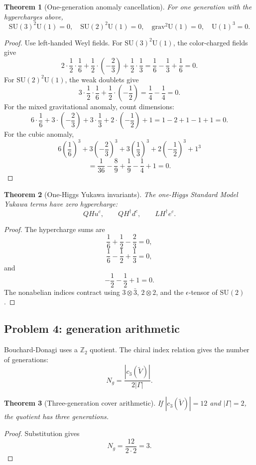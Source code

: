 \documentclass[11pt]{article}
\newtheorem{theorem}{Theorem}[section]
\theoremstyle{remark}
\theoremstyle{plain}
\newcommand{\SU}{\mathrm{SU}}
\newcommand{\U}{\mathrm{U}}
\newcommand{\Z}{\mathbb Z}
\begin{document}
\begin{theorem}[One-generation anomaly cancellation]
For one generation with the hypercharges above,
\[
\SU(3)^2\U(1)=0,\quad
\SU(2)^2\U(1)=0,\quad
\mathrm{grav}^2\U(1)=0,\quad
\U(1)^3=0.
\]
\end{theorem}

\begin{proof}
Use left-handed Weyl fields. For \(\SU(3)^2\U(1)\), the color-charged fields give
\[
2\cdot\frac12\cdot\frac16
+\frac12\cdot\left(-\frac23\right)
+\frac12\cdot\frac13
=
\frac16-\frac13+\frac16=0.
\]
For \(\SU(2)^2\U(1)\), the weak doublets give
\[
3\cdot\frac12\cdot\frac16
+\frac12\cdot\left(-\frac12\right)
=\frac14-\frac14=0.
\]
For the mixed gravitational anomaly, count dimensions:
\[
6\cdot\frac16
+3\cdot\left(-\frac23\right)
+3\cdot\frac13
+2\cdot\left(-\frac12\right)
+1
=1-2+1-1+1=0.
\]
For the cubic anomaly,
\[
6\left(\frac16\right)^3
+3\left(-\frac23\right)^3
+3\left(\frac13\right)^3
+2\left(-\frac12\right)^3
+1^3
\]
\[
=\frac1{36}-\frac89+\frac19-\frac14+1
=0.
\]
\end{proof}

\begin{theorem}[One-Higgs Yukawa invariants]
The one-Higgs Standard Model Yukawa terms have zero hypercharge:
\[
QHu^c,\qquad QH^\dagger d^c,\qquad LH^\dagger e^c.
\]
\end{theorem}

\begin{proof}
The hypercharge sums are
\[
\frac16+\frac12-\frac23=0,
\]
\[
\frac16-\frac12+\frac13=0,
\]
and
\[
-\frac12-\frac12+1=0.
\]
The nonabelian indices contract using \(3\otimes\bar3\), \(2\otimes2\), and the
\(\epsilon\)-tensor of \(\SU(2)\).
\end{proof}

\subsection{Problem 4: generation arithmetic}

Bouchard-Donagi uses a \(\Z_2\) quotient. The chiral index relation gives the number of
generations:
\[
N_g=\frac{|c_3(\widetilde V)|}{2|\Gamma|}.
\]

\begin{theorem}[Three-generation cover arithmetic]
If \(|c_3(\widetilde V)|=12\) and \(|\Gamma|=2\), the quotient has three generations.
\end{theorem}

\begin{proof}
Substitution gives
\[
N_g=\frac{12}{2\cdot2}=3.
\]
\end{proof}
\end{document}
